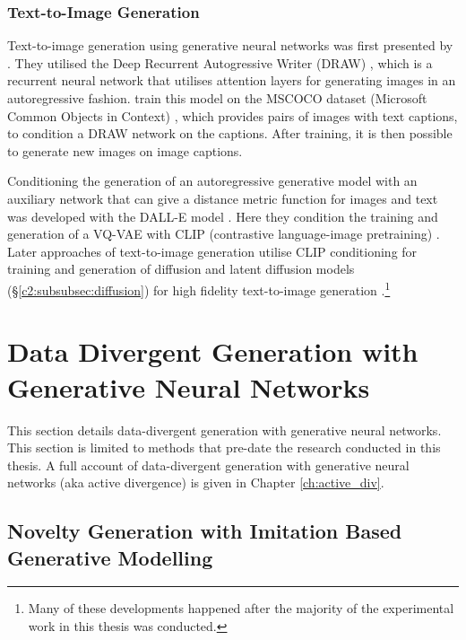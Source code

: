 \subsubsection{Text-to-Image Generation}

Text-to-image generation using generative neural networks was first presented by \cite{mansimov2015generating}.
They utilised the Deep Recurrent Autogressive Writer (DRAW) \citep{gregor2015draw}, which is a recurrent neural network that utilises attention layers for generating images in an autoregressive fashion.
\cite{mansimov2015generating} train this model on the MSCOCO dataset (Microsoft Common Objects in Context) \citep{lin2014microsoft}, which provides pairs of images with text captions, to condition a DRAW network on the captions.
After training, it is then possible to generate new images on image captions.

Conditioning the generation of an autoregressive generative model with an auxiliary network that can give a distance metric function for images and text was developed with the DALL-E model \citep{ramesh2021zero}.
Here they condition the training and generation of a VQ-VAE \citep{razavi2019generating} with CLIP (contrastive language-image pretraining) \citep{radford2021learning}.
Later approaches of text-to-image generation utilise CLIP conditioning for training and generation of diffusion and latent diffusion models (\S \ref{c2:subsubsec:diffusion}) for high fidelity text-to-image generation \citep{rombach2022high}.\footnote{Many of these developments happened after the majority of the experimental work in this thesis was conducted.}


\section{Data Divergent Generation with Generative Neural Networks}
\label{c2:sec:data-divergent}

This section details data-divergent generation with generative neural networks. 
This section is limited to methods that pre-date the research conducted in this thesis.
A full account of data-divergent generation with generative neural networks (aka active divergence) is given in Chapter \ref{ch:active_div}.

\subsection{Novelty Generation with Imitation Based Generative Modelling}

